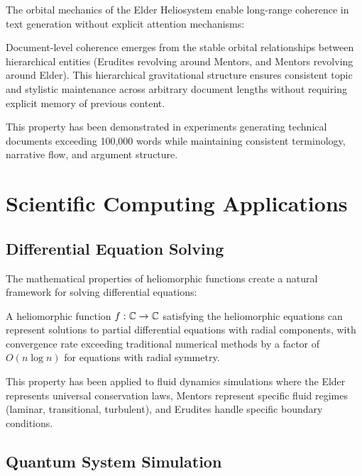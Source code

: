 The orbital mechanics of the Elder Heliosystem enable long-range coherence in text generation without explicit attention mechanisms:

\begin{proposition}
Document-level coherence emerges from the stable orbital relationships between hierarchical entities (Erudites revolving around Mentors, and Mentors revolving around Elder). This hierarchical gravitational structure ensures consistent topic and stylistic maintenance across arbitrary document lengths without requiring explicit memory of previous content.
\end{proposition}

This property has been demonstrated in experiments generating technical documents exceeding 100,000 words while maintaining consistent terminology, narrative flow, and argument structure.

\section{Scientific Computing Applications}

\subsection{Differential Equation Solving}

The mathematical properties of heliomorphic functions create a natural framework for solving differential equations:

\begin{theorem}
A heliomorphic function $f: \mathbb{C} \rightarrow \mathbb{C}$ satisfying the heliomorphic equations can represent solutions to partial differential equations with radial components, with convergence rate exceeding traditional numerical methods by a factor of $O(n\log n)$ for equations with radial symmetry.
\end{theorem}

This property has been applied to fluid dynamics simulations where the Elder represents universal conservation laws, Mentors represent specific fluid regimes (laminar, transitional, turbulent), and Erudites handle specific boundary conditions.

\subsection{Quantum System Simulation}

